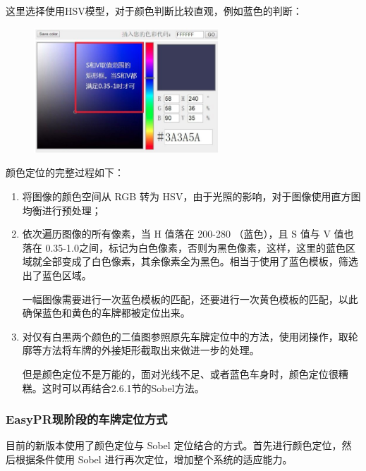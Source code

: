 这里选择使用HSV模型，对于颜色判断比较直观，例如蓝色的判断：
\begin{figure}[H]
    \centering 
    \includegraphics[width=0.618\textwidth]{image/2_6_2_2.jpg}    
    \label{logic}
\end{figure}
颜色定位的完整过程如下：
\begin{enumerate}
\item
将图像的颜色空间从 RGB 转为 HSV，由于光照的影响，对于图像使用直方图均衡进行预处理；
\item
依次遍历图像的所有像素，当 H 值落在 200-280 （蓝色），且 S 值与 V 值也落在 0.35-1.0之间，标记为白色像素，否则为黑色像素，这样，这里的蓝色区域就全部变成了白色像素，其余像素全为黑色。相当于使用了蓝色模板，筛选出了蓝色区域。

一幅图像需要进行一次蓝色模板的匹配，还要进行一次黄色模板的匹配，以此确保蓝色和黄色的车牌都被定位出来。 
\item
对仅有白黑两个颜色的二值图参照原先车牌定位中的方法，使用闭操作，取轮廓等方法将车牌的外接矩形截取出来做进一步的处理。

但是颜色定位不是万能的，面对光线不足、或者蓝色车身时，颜色定位很糟糕。这时可以再结合2.6.1节的Sobel方法。
\end{enumerate}

\subsubsection{EasyPR现阶段的车牌定位方式}
目前的新版本使用了颜色定位与 Sobel 定位结合的方式。首先进行颜色定位，然后根据条件使用 Sobel 进行再次定位，增加整个系统的适应能力。 

